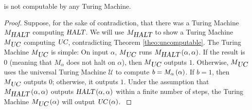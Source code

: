 \begin{theo}
{\slHALT} is not computable by any Turing Machine.
\begin{proof}
Suppose, for the sake of contradiction, that there was a Turing Machine $M_{\mbox{\sl HALT}}$ computing $\mbox{\sl HALT}$. We will use $M_{\mbox{\sl HALT}}$ to show a Turing Machine $M_{\mbox{\sl UC}}$ computing $\mbox{\sl UC}$, contradicting Theorem \ref{theo:uncomputable}. The Turing Machine $M_{\mbox{\sl UC}}$ is simple: On input $\alpha$, $M_{\mbox{\sl UC}}$ runs $M_{\mbox{\sl HALT}}\left(\alpha,\alpha\right)$. If the result is 0 (meaning that $M_\alpha$ does not halt on $\alpha$), then $M_{\mbox{\sl UC}}$ outputs $1$. Otherwise, $M_{\mbox{\sl UC}}$ uses the universal Turing Machine $\mathcal{U}$ to compute $b=M_{\alpha}\left(\alpha\right)$. If $b=1$, then $M_{\mbox{\sl UC}}$ outputs $0$; otherwise, it outputs $1$. Under the assumption that $M_{\mbox{\sl HALT}}\left(\alpha,\alpha\right)$ outputs $\mbox{\sl HALT}\left(\alpha,\alpha\right)$ within a finite number of steps, the Turing Machine $M_{\mbox{\sl UC}}\left(\alpha\right)$ will output $\mbox{\sl UC}\left(\alpha\right)$.
\cite{arora2009computational}
\end{proof}
\end{theo}

